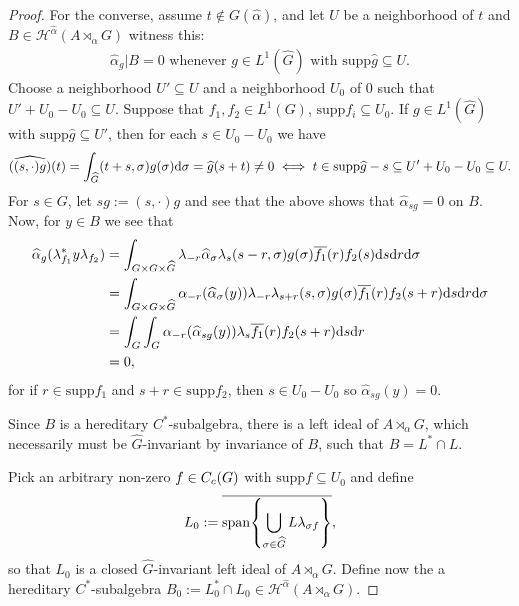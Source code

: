 \begin{proof}
	For the converse, assume $t \not \in G(\hat \alpha)$, and let $U$ be a neighborhood of $t$ and $B \in \mathscr{H}^{\hat \alpha}(A \rtimes_\alpha G)$ witness this: 
	\begin{align*}
		\hat \alpha _g | B = 0 \text{ whenever } g \in L^1(\hat G) \text{ with } \mathrm{supp} \hat g \subseteq U.
	\end{align*}
	Choose a neighborhood $U' \subseteq U$ and a neighborhood $U_0$ of $0$ such that $U' + U_0-U_0 \subseteq U$. Suppose that $f_1,f_2 \in L^1(G)$, $\mathrm{supp} f_i \subseteq U_0$. If $g \in L^1(\hat G)$ with $\mathrm{supp} \hat g \subseteq U'$, then for each $s \in U_0-U_0$ we have
\begin{align}
	\widehat{((s,\cdot)g)}(t) = \int_{\widehat{G}} (t+s, \sigma) g(\sigma) \mathrm{d} \sigma = \widehat{g}(s+t)  \neq 0 \iff t \in \mathrm{supp} \widehat{g} - s \subseteq U'+U_0-U_0 \subseteq U.
	\label{L0eq1}
\end{align}
For $s \in G$, let $sg := (s, \cdot) g$ and see that the above shows that $\hat \alpha_{sg} = 0$ on $B$. Now, for $y \in B$ we see that
\begin{align}
	\widehat{\alpha}_g(\lambda_{f_1}^* y \lambda_{f_2}) &=  \int_{G \times G \times \widehat{G}} \lambda_{-r} \widehat{\alpha}_\sigma \lambda_s (s-r,\sigma) g(\sigma) \overline{f_1}(r) f_2(s) \mathrm{d} s \mathrm{d} r \mathrm{d} \sigma\\
	&=  \int_{G \times G \times \widehat{G}} \alpha_{-r}(\widehat{\alpha}_\sigma(y)) \lambda_{-r} \lambda_{s+r}(s,\sigma) g(\sigma) \overline{f_1}(r) f_2(s+r) \mathrm{d} s \mathrm{d} r \mathrm{d} \sigma\\
	&= \int_{G} \int_G \alpha_{-r}(\widehat{\alpha}_{sg}(y)) \lambda_s \overline{f_1}(r) f_2(s+r) \mathrm{d} s \mathrm{d} r\\
	&= 0,
	\label{L0eq2}
\end{align}
for if $r \in \mathrm{supp} f_1$ and $s+r \in \mathrm{supp} f_2$, then $s \in U_0-U_0$ so $\hat \alpha_{sg}(y) = 0$.

Since $B$ is a hereditary $C^*$-subalgebra, there is a left ideal of $A \rtimes_\alpha G$, which necessarily must be $\hat G$-invariant by invariance of $B$, such that $B = L^* \cap L$.

Pick an arbitrary non-zero $f \in C_c(G)$ with $\mathrm{supp} f \subseteq U_0$ and define
\begin{align*}
	L_0 :=	\overline{\mathrm{span} {\left\{\bigcup_{\sigma \in \widehat{G}} L \lambda_{\sigma f}\right\}}},
\end{align*}
so that $L_0$ is a closed $\hat G$-invariant left ideal of $A \rtimes_\alpha G$. Define now the a hereditary $C^*$-subalgebra $B_0:= L_0^* \cap L_0 \in \mathscr H^{\hat \alpha}(A \rtimes_{\alpha}G)$.


\end{proof}
